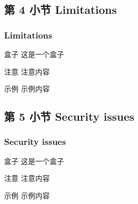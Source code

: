 \documentclass[
    aspectratio=169,                   %
]{beamer}
\begin{document}
\subsection{第 4 小节 Limitations}

    \begin{frame}
        \frametitle{Limitations}
        
        \begin{block}{盒子}
            这是一个盒子\cite{novo}
        \end{block}

        \begin{alertblock}{注意}
            注意内容
        \end{alertblock}

        \begin{exampleblock}{示例}
            示例内容
        \end{exampleblock}
    \end{frame}

\subsection{第 5 小节 Security issues}

    \begin{frame}
        \frametitle{Security issues}
        
        \begin{block}{盒子}
            这是一个盒子\cite{novo}
        \end{block}

        \begin{alertblock}{注意}
            注意内容
        \end{alertblock}

        \begin{exampleblock}{示例}
            示例内容
        \end{exampleblock}
    \end{frame}


\end{document}
